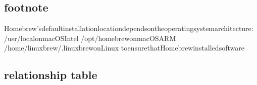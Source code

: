 \documentclass[letterpaper,10pt,english]{sphinxmanual}
\begin{document}
\subsection{footnote}
\label{\detokenize{dita-examples/dita-source-reading:footnote}}
\sphinxAtStartPar
{}

\begin{sphinxVerbatim}[commandchars=\\\{\}]
Homebrew’sdefaultinstallationlocationdependsontheoperatingsystemarchitecture:
/usr/localonmacOSIntel
/opt/homebrewonmacOSARM
/home/linuxbrew/.linuxbrewonLinux
toensurethatHomebrew\PYGZhy{}installedsoftware
\end{sphinxVerbatim}


\subsection{relationship table}
\label{\detokenize{dita-examples/dita-source-reading:relationship-table}}
\sphinxAtStartPar
{}
\end{document}
